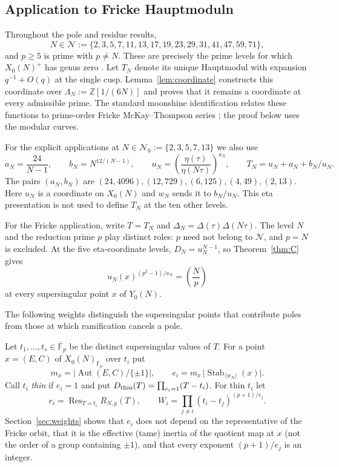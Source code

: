 \documentclass[11pt,a4paper]{article}
\numberwithin{equation}{section}
\theoremstyle{definition}
\theoremstyle{remark}
\newcommand{\Fb}{\overline{\mathbb F}_p}
\newcommand{\Z}{\mathbb Z}
\newcommand{\Res}{\operatorname{Res}}
\newcommand{\Aut}{\operatorname{Aut}}
\newcommand{\Stab}{\operatorname{Stab}}
\newcommand{\Lp}[1]{\left(\frac{#1}{p}\right)}
\begin{document}
\subsection{Application to Fricke Hauptmoduln}
Throughout the pole and residue results,
\[
N\in\mathcal N:=\{2,3,5,7,11,13,17,19,23,29,31,41,47,59,71\},
\]
and $p\ge5$ is prime with $p\ne N$.
These are precisely the prime levels for which $X_0(N)^+$ has genus
zero \citep[\S3, Corollary]{Ogg75}. Let $T_N$ denote its unique
Hauptmodul with expansion $q^{-1}+O(q)$ at the single cusp.
Lemma~\ref{lem:coordinate} constructs this coordinate over
$\Lambda_N:=\Z[1/(6N)]$ and proves that it remains a coordinate
at every admissible prime. The standard moonshine identification
relates these functions to prime-order Fricke McKay--Thompson series
\citep{CN79,CMT19}; the proof below uses the modular curves.

For the explicit applications at
$N\in\mathcal N_0:=\{2,3,5,7,13\}$ we also use
\[
a_N=\frac{24}{N-1},\qquad b_N=N^{12/(N-1)},\qquad
u_N=\left(\frac{\eta(\tau)}{\eta(N\tau)}\right)^{a_N},\qquad
T_N=u_N+a_N+b_N/u_N.
\]
The pairs $(a_N,b_N)$ are $(24,4096),(12,729),(6,125),(4,49),(2,13)$.
Here $u_N$ is a coordinate on $X_0(N)$ and $w_N$ sends it to $b_N/u_N$.
This eta presentation is not used to define $T_N$ at the ten other levels.

For the Fricke application, write $T=T_N$ and
$\Delta_N=\Delta(\tau)\Delta(N\tau)$. The level $N$ and the
reduction prime $p$ play distinct roles: $p$ need not belong to
$\mathcal N$, and $p=N$ is excluded.
At the five eta-coordinate levels, $D_N=u_N^{N-1}$, so
Theorem~\ref{thm:C} gives
\[
u_N(x)^{(p^2-1)/a_N}=\Lp N
\]
at every supersingular point $x$ of $Y_0(N)$.

The following weights distinguish the supersingular points that
contribute poles from those at which ramification cancels a pole.

Let $t_1,\dots,t_s\in\Fb$ be the distinct supersingular values of $T$. For a point
$x=(E,C)$ of $X_0(N)_{\Fb}$ over $t_i$ put
\[
m_x=\bigl|\Aut(E,C)/\{\pm1\}\bigr|,\qquad e_i=m_x\,\bigl|\Stab_{\langle w_N\rangle}(x)\bigr|.
\]
Call $t_i$ \emph{thin} if $e_i=1$ and put $D_{\rm thin}(T)=\prod_{e_i=1}(T-t_i)$. For thin $t_i$ let
\[
r_i=\Res_{T=t_i}R_{N,p}(T),\qquad W_i=\prod_{j\ne i}(t_i-t_j)^{(p+1)/e_j}.
\]
Section~\ref{sec:weights} shows that $e_i$ does not depend on the representative of the Fricke
orbit, that it is the effective (tame) inertia of the quotient map at $x$ (not the order of a group
containing $\pm1$), and that every exponent $(p+1)/e_j$ is an integer.
\end{document}
